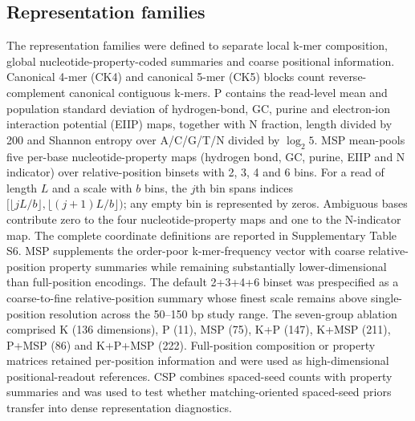 \subsection{Representation families}

The representation families were defined to separate local k-mer composition, global nucleotide-property-coded summaries and coarse positional information. Canonical 4-mer (CK4) and canonical 5-mer (CK5) blocks count reverse-complement canonical contiguous k-mers. P contains the read-level mean and population standard deviation of hydrogen-bond, GC, purine and electron-ion interaction potential (EIIP) maps, together with N fraction, length divided by 200 and Shannon entropy over A/C/G/T/N divided by $\log_2 5$. MSP mean-pools five per-base nucleotide-property maps (hydrogen bond, GC, purine, EIIP and N indicator) over relative-position binsets with 2, 3, 4 and 6 bins. For a read of length $L$ and a scale with $b$ bins, the $j$th bin spans indices $[\lfloor jL/b\rfloor,\lfloor(j+1)L/b\rfloor)$; any empty bin is represented by zeros. Ambiguous bases contribute zero to the four nucleotide-property maps and one to the N-indicator map. The complete coordinate definitions are reported in Supplementary Table S6. MSP supplements the order-poor k-mer-frequency vector with coarse relative-position property summaries while remaining substantially lower-dimensional than full-position encodings. The default 2+3+4+6 binset was prespecified as a coarse-to-fine relative-position summary whose finest scale remains above single-position resolution across the 50--150 bp study range. The seven-group ablation comprised K (136 dimensions), P (11), MSP (75), K+P (147), K+MSP (211), P+MSP (86) and K+P+MSP (222). Full-position composition or property matrices retained per-position information and were used as high-dimensional positional-readout references. CSP combines spaced-seed counts with property summaries and was used to test whether matching-oriented spaced-seed priors transfer into dense representation diagnostics.

